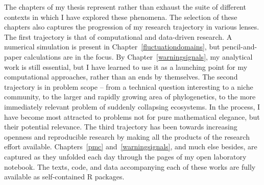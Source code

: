 The chapters of my thesis represent rather than exhaust the suite of different contexts in which I have explored these phenomena.  The selection of these chapters also captures the progression of my research trajectory in various lenses.  The first trajectory is that of computational and data-driven research.  A numerical simulation is present in Chapter~\ref{fluctuationdomains}, but pencil-and-paper calculations are in the focus.  By Chapter~\ref{warningsignals}, my analytical work is still essential, but I have learned to use it as a launching point for my computational approaches, rather than an ends by themselves.  The second trajectory is in problem scope -- from a technical question interesting to a niche community, to the larger and rapidly growing area of phylogenetics, to the more immediately relevant problem of suddenly collapsing ecosystems.  In the process, I have become most attracted to problems not for pure mathematical elegance, but their potential relevance.  The third trajectory has been towards increasing openness and reproducible research by making all the products of the research effort available.  Chapters~\ref{pmc} and~\ref{warningsignals}, and much else besides, are captured as they unfolded each day through the pages of my open laboratory notebook.  The texts, code, and data accompanying each of these works are fully available as self-contained R packages.  


